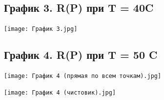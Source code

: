 \documentclass[15pt,a5paper,reqno]{article}
\begin{document}
    \newpage
    \subsection{График 3. R(P) при T = 40\degree C}
    
    \begin{center}
        \centering
        \texttt{[image: График 3.jpg]}
    \end{center}
    
    \newpage
    \subsection{График 4. R(P) при T = 50 \degree C}
    
    \begin{center}
        \centering
        \texttt{[image: График 4 (прямая по всем точкам).jpg]}
    \end{center}
    \begin{center}
        \centering
        \texttt{[image: График 4 (чистовик).jpg]}
    \end{center}
\end{document}
